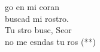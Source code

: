 \begin{cancion}%
	go en mi coran \\
buscad mi rostro.\\
	Tu stro busc, Seor \\
	no me esndas tu ros (**)\\
\end{cancion}%
